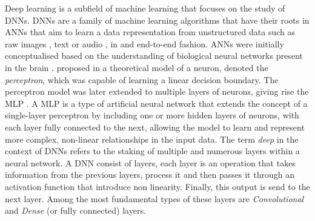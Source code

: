Deep learning is a subfield of machine learning that focuses on the study of
\acp{DNN}. \acp{DNN} are a family of machine learning algorithms that have their
roots in \acp{ANN} that aim to learn a data representation from unstructured
data such as raw images \cite{DBLP:conf/nips/KrizhevskySH12}, text
\cite{DBLP:conf/emnlp/BudzianowskiV19} or audio
\cite{DBLP:journals/corr/HannunCCCDEPSSCN14}, in and end-to-end fashion.
\acp{ANN} were initially conceptualised based on the understanding of biological
neural networks present in the brain
\cite{mcculloch1943logical,hebb2005organization}.
\citeauthor{rosenblatt1958perceptron} proposed in
\cite{rosenblatt1958perceptron} a theoretical model of a neuron, denoted the
\emph{perceptron}, which was capable of learning a linear decision boundary. The
perceptron model was later extended to multiple layers of neurons, giving rise
the \ac{MLP} \cite{rosenblatt1961principles,rumelhart1986learning}. A \acl{MLP}
is a type of artificial neural network that extends the concept of a
single-layer perceptron by including one or more hidden layers of neurons, with
each layer fully connected to the next, allowing the model to learn and
represent more complex, non-linear relationships in the input data. The term
\emph{deep} in the context of \acp{DNN} refers to the staking of multiple and
numerous layers within a neural network. A \ac{DNN} consist of layers, each
layer is an operation that takes information from the previous layers, process
it and then passes it through an activation function
\cite{glorot2011deep,DBLP:journals/pieee/LeCunBBH98,klambauer2017self} that
introduce non linearity. Finally, this output is send to the next layer.
Among the most fundamental types of these layers are \emph{Convolutional} and
\emph{Dense} (or fully connected) layers. \\

